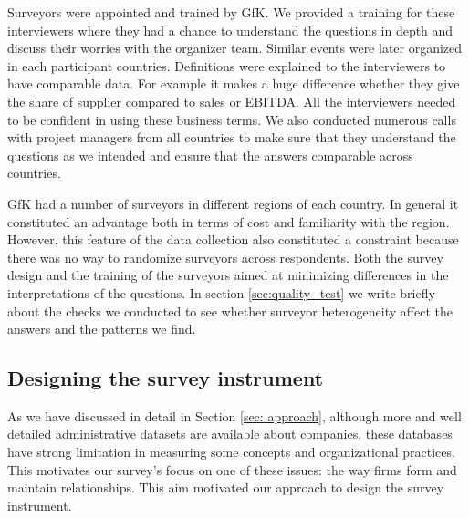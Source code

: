 \documentclass[final, dvipsnames, authoryear,12pt]{elsarticle}
\begin{document}

Surveyors were appointed and trained by GfK. We provided a training for these interviewers where they had a chance to understand the questions in depth and discuss their worries with the organizer team. Similar events were later organized in each participant countries. Definitions were explained to the interviewers to have comparable data. For example it makes a huge difference whether they give the share of supplier compared to sales or EBITDA. All the interviewers needed to be confident in using these business terms. We also conducted numerous calls with project managers from all countries to make sure that they understand the questions as we intended and ensure that the answers comparable across countries. 

GfK had a number of surveyors in different regions of each country. In general it constituted an advantage both in terms of cost and familiarity with the region. However, this feature of the data collection also constituted a constraint because there was no way to randomize surveyors across respondents. Both the survey design and the training of the surveyors aimed at minimizing differences in the interpretations of the questions. In section \ref{sec:quality_test} we write briefly about the checks we conducted to see whether surveyor heterogeneity affect the answers and the patterns we find.





\subsection{Designing the survey instrument}

As we have discussed in detail in Section \ref{sec: approach}, although more and well detailed administrative datasets are available about companies, these databases have strong limitation in measuring some concepts and organizational practices. This motivates our survey's focus on one of these issues: the way firms form and maintain relationships. This aim motivated our approach to design the survey instrument.
\end{document}
